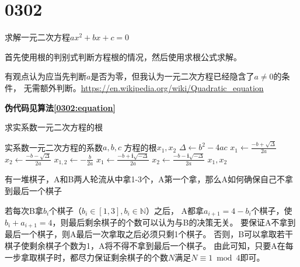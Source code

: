 \section{0302}

\begin{questions}

    \question 求解一元二次方程$ax^2+bx+c=0$

    \begin{solution}
        首先使用根的判别式判断方程根的情况，然后使用求根公式求解。

        {
        \color{red}
        有观点认为应当先判断$a$是否为零，但我认为一元二次方程已经隐含了$a \ne 0$的条件，
        无需额外判断。\url{https://en.wikipedia.org/wiki/Quadratic_equation}
        }

        \textbf{伪代码见算法\ref{0302:equation}}
    \end{solution}

    \begin{algorithm}[!htp]
        \caption{求实系数一元二次方程的根}\label{0302:equation}
        \begin{algorithmic}[1]
            \Require 实系数一元二次方程的系数$a,b,c$
            \Ensure 方程的根$x_1,x_2$
            \State $\Delta \gets b^2-4ac$ 
             
            \State $x_1 \gets \frac{-b + \sqrt{\Delta}}{2a}$
            \State $x_2 \gets \frac{-b - \sqrt{\Delta}}{2a}$
             
            \State $x_{1,2} \gets -\frac{b}{2a}$
             
            \State $x_1 \gets \frac{-b + \bm{i}\sqrt{-\Delta}}{2a}$
            \State $x_2 \gets \frac{-b - \bm{i}\sqrt{-\Delta}}{2a}$
            \EndIf
            \State \Return $x_1, x_2$
        \end{algorithmic}
    \end{algorithm}

    \question 有一堆棋子，A和B两人轮流从中拿1-3个，A第一个拿，那么A如何确保自己不拿到最后一个棋子

    \begin{solution}

        若每次B拿$b_i$个棋子（$b_i \in [1,3], b_i \in \mathbb{N}$）之后，
        A都拿$a_{i+1} = 4 - b_{i}$个棋子，使$b_i + a_{i+1} = 4$，则最后剩余棋子的个数可以认为与B的决策无关。
        要保证A不拿到最后一个棋子，则A最后一次拿取之后必须只剩1个棋子。
        否则，B可以拿取若干棋子使剩余棋子个数为1，A将不得不拿到最后一个棋子。
        由此可知，只要A在每一步拿取棋子时，都尽力保证剩余棋子的个数$N$满足$N \equiv 1 \bmod 4$即可。


\end{solution}
\end{questions}
